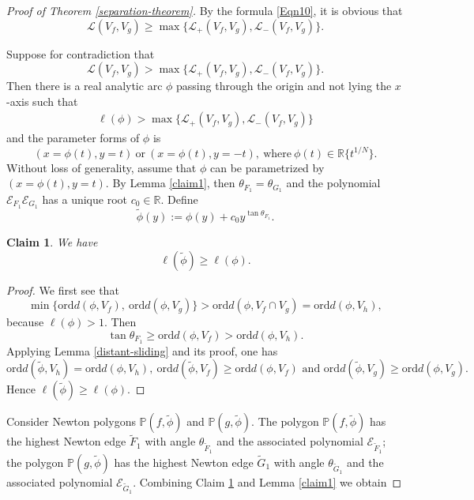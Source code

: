 \documentclass[reqno, 12pt ,a4letter]{amsart}
\newtheorem {claim}{Claim}[section]
\theoremstyle{definition}
\begin{document}
\begin{proof}[Proof of Theorem \ref{separation-theorem}]
	By the formula \eqref{Eqn10}, it is obvious that $$ \mathscr{L}(V_f, V_g) \geq \max\{\mathscr{L}_{+}(V_f, V_g), \mathscr{L}_{-}(V_f, V_g)\}. $$
	
	Suppose for contradiction that $$ \mathscr{L}(V_f, V_g) > \max\{\mathscr{L}_{+}(V_f, V_g), \mathscr{L}_{-}(V_f, V_g)\}. $$
	Then there is a real analytic arc $\phi$ passing through the origin and not lying the $x$-axis such that 
	\begin{align}\label{contradicted-assumption}
	 \ell(\phi) > \max\{\mathscr{L}_{+}(V_f, V_g), \mathscr{L}_{-}(V_f, V_g)\}	
	\end{align}
	and the parameter forms of $\phi$ is 
	$$ (x = \phi(t), y = t)\ \text{or}\ (x = \phi(t), y = -t),\ \text{where}\ \phi(t) \in \mathbb{R}\{t^{1/N}\}. $$
    Without loss of generality, assume that $\phi$ can be parametrized by $(x = \phi(t), y = t)$. 
    By Lemma \ref{claim1}, then $\theta_{F_1} = \theta_{G_1}$ and the polynomial $\mathcal{E}_{F_1}\mathcal{E}_{G_1}$ has a unique root $c_0 \in \mathbb{R}$. Define 
$$ \tilde\phi(y) := \phi(y) + c_0y^{\tan\theta_{F_1}}. $$
\begin{claim}\label{claim4} We have
	$$\ell(\tilde\phi) \ge \ell(\phi).$$
\end{claim}
\begin{proof}
We first see that $$\min\{\mathrm{ord}d(\phi, V_f),\  \mathrm{ord}d(\phi, V_g)\} > \mathrm{ord}d(\phi, V_f \cap V_g)=\mathrm{ord}d(\phi, V_h),$$
because $\ell(\phi)>1$. Then $$\tan\theta_{F_1}\geq \mathrm{ord}d(\phi, V_f)> \mathrm{ord}d(\phi, V_h).$$
Applying Lemma \ref{distant-sliding} and its proof, one has
$$\mathrm{ord}d(\tilde\phi, V_h)=\mathrm{ord}d(\phi, V_h),\ \mathrm{ord}d(\tilde\phi, V_f)\geq \mathrm{ord}d(\phi, V_f) \text{ and } \mathrm{ord}d(\tilde\phi, V_g)\geq\mathrm{ord}d(\phi, V_g).$$
Hence $\ell(\tilde\phi) \ge \ell(\phi).$
\end{proof}

Consider Newton polygons $\mathbb{P}(f,\tilde\phi)$ and $\mathbb{P}(g,\tilde\phi)$. The polygon $\mathbb{P}(f,\tilde\phi)$ has the highest Newton edge $\widetilde{F}_1$ with angle $\theta_{\widetilde{F}_1}$ and the associated polynomial $\mathcal{E}_{\widetilde{F}_1}$; the polygon $\mathbb{P}(g,\tilde\phi)$ has the highest Newton edge $\widetilde{G}_1$ with angle $\theta_{\widetilde{G}_1}$ and the associated polynomial $\mathcal{E}_{\widetilde{G}_1}$. Combining Claim \ref{claim4} and Lemma \ref{claim1} we obtain 


\end{proof}
\end{document}
